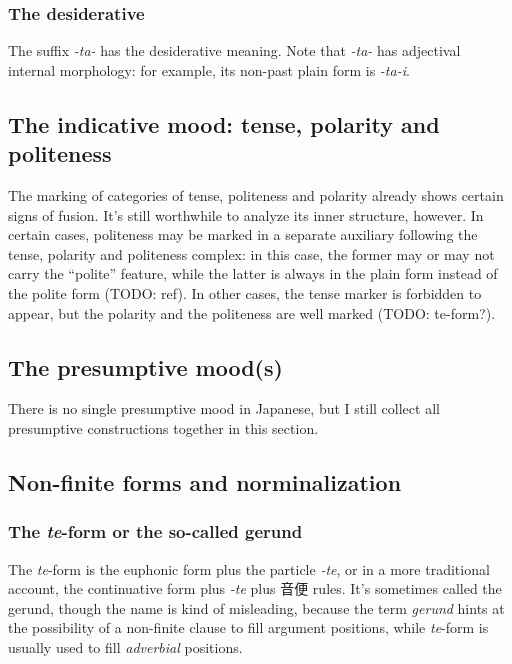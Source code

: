 \documentclass[UTF8, a4paper, oneside, scheme=plain]{ctexrep}
\newcommand*{\term}[1]{\emph{#1}}
\newcommand{\corpus}[1]{\emph{#1}}
\begin{document}
\subsubsection{The desiderative}

The suffix \corpus{-ta-} has the desiderative meaning.
Note that \corpus{-ta-} has adjectival internal morphology:
for example, its non-past plain form is \corpus{-ta-i}.

\subsection{The indicative mood: tense, polarity and politeness}\label{sec:tense-polarity-polite}

The marking of categories of tense, politeness and polarity 
already shows certain signs of fusion.
It's still worthwhile to analyze its inner structure, however.
In certain cases,
politeness may be marked in a separate auxiliary following the tense, polarity and politeness complex:
in this case, the former may or may not carry the ``polite'' feature,
while the latter is always in the plain form instead of the polite form (TODO: ref).
In other cases, the tense marker is forbidden to appear,
but the polarity and the politeness are well marked (TODO: te-form?).

\subsection{The presumptive mood(s)}

There is no single presumptive mood in Japanese,
but I still collect all presumptive constructions together in this section.

\subsection{Non-finite forms and norminalization}

\subsubsection{The \corpus{te}-form or the so-called gerund}\label{sec:te-form}

The \corpus{te}-form is the euphonic form plus the particle \corpus{-te},
or in a more traditional account,
the continuative form plus \corpus{-te} plus 音便 rules.
It's sometimes called the gerund,
though the name is kind of misleading,
because the term \term{gerund} hints at the possibility of a non-finite clause to fill argument positions,
while \corpus{te}-form is usually used to fill \emph{adverbial} positions.
\end{document}
